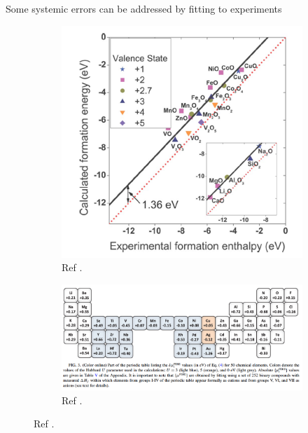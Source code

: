 \documentclass[aspectratio=169]{beamer}
\begin{document}
\begin{frame}{Some systemic errors can be addressed by fitting to experiments}
\begin{figure}
    \centering
    \begin{subfigure}{0.35\textwidth}
    \includegraphics[width=\linewidth]{lectures/figures/6_oxidation_fitting.png}
    \caption{Ref \cite{wangOxidationEnergiesTransition2006}.}
    \end{subfigure}
    \begin{subfigure}{0.6\textwidth}
    \includegraphics[width=\linewidth]{lectures/figures/6_oxidation_fitting2.png}
    \caption{Ref \cite{stevanovicCorrectingDensityFunctional2012}.}
    \end{subfigure}
    \end{figure}
\end{frame} 
\end{document}
